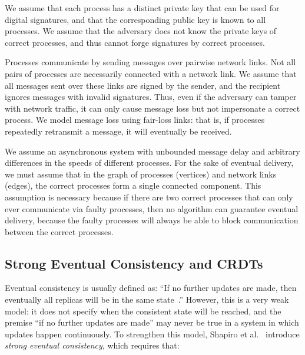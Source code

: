 \documentclass[a4paper,anonymous,USenglish]{lipics-v2019}
\begin{document}
We assume that each process has a distinct private key that can be used for digital signatures, and that the corresponding public key is known to all processes.
We assume that the adversary does not know the private keys of correct processes, and thus cannot forge signatures by correct processes.

Processes communicate by sending messages over pairwise network links.
Not all pairs of processes are necessarily connected with a network link.
We assume that all messages sent over these links are signed by the sender, and the recipient ignores messages with invalid signatures.
Thus, even if the adversary can tamper with network traffic, it can only cause message loss but not impersonate a correct process.
We model message loss using fair-loss links: that is, if processes repeatedly retransmit a message, it will eventually be received.

We assume an asynchronous system with unbounded message delay and arbitrary differences in the speeds of different processes.
For the sake of eventual delivery, we must assume that in the graph of processes (vertices) and network links (edges), the correct processes form a single connected component.
This assumption is necessary because if there are two correct processes that can only ever communicate via faulty processes, then no algorithm can guarantee eventual delivery, because the faulty processes will always be able to block communication between the correct processes.


\subsection{Strong Eventual Consistency and CRDTs}\label{sec:applications}

Eventual consistency is usually defined as: ``If no further updates are made, then eventually all replicas will be in the same state~\cite{Vogels:2009ca}.''
However, this is a very weak model: it does not specify when the consistent state will be reached, and the premise ``if no further updates are made'' may never be true in a system in which updates happen continuously.
To strengthen this model, Shapiro et al.~\cite{Shapiro:2011} introduce \emph{strong eventual consistency}, which requires that:
\end{document}
